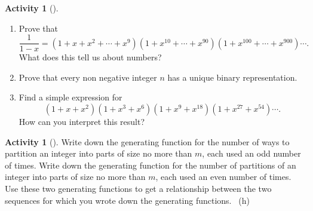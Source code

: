 \documentclass[10pt,]{book}
\theoremstyle{plain}
\theoremstyle{definition}
\theoremstyle{definition}
\theoremstyle{definition}
\newtheorem{activity}[project]{Activity}
\numberwithin{equation}{chapter}
\begin{document}
\begin{activity}[]\label{activity-318}
\leavevmode%
\begin{enumerate}[font=\bfseries,label=(\alph*),ref=\alph*]
\item\label{task-276} \hypertarget{p-1607}{}%
Prove that%
\begin{equation*}
\frac{1}{1-x} = (1 + x + x^2 +\cdots + x^9)(1 + x^{10} + \cdots + x^{90})(1 + x^{100} + \cdots + x^{900})\cdots.
\end{equation*}
What does this tell us about numbers?%
\item\label{task-277} \hypertarget{p-1608}{}%
Prove that every non negative integer \(n\) has a unique binary representation.%
\item\label{task-278} \hypertarget{p-1609}{}%
Find a simple expression for%
\begin{equation*}
(1+x+x^2)(1+x^3+x^6)(1+x^9+x^{18})(1+x^{27}+x^{54})\cdots.
\end{equation*}
How can you interpret this result?%
\end{enumerate}
\end{activity}
\begin{activity}[]\label{activity-319}
\hypertarget{p-1610}{}%
Write down the generating function for the number of ways to partition an integer into parts of size no more than \(m\), each used an odd number of times. Write down the generating function for the number of partitions of an integer into parts of size no more than \(m\), each used an even number of times. Use these two generating functions to get a relationship between the two sequences for which you wrote down the generating functions.%
~{\tiny (h)}\end{activity}
\end{document}
